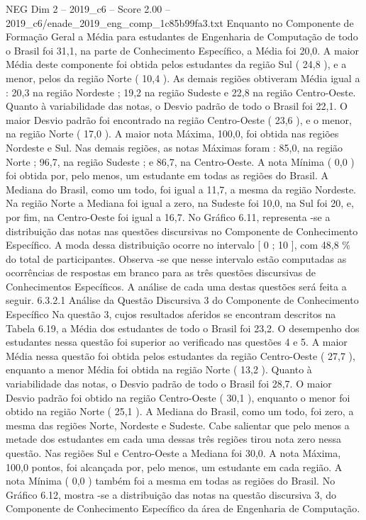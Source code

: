 \begin{textsample}{NEG Dim 2 – 2019\_c6 – Score 2.00 – 2019\_c6/enade\_2019\_eng\_comp\_1c85b99fa3.txt}
Enquanto no Componente de Formação Geral a Média para estudantes de Engenharia de Computação de todo o Brasil foi 31,1, na parte de Conhecimento Específico, a Média foi 20,0.
A maior Média deste componente foi obtida pelos estudantes da região Sul ( 24,8 ), e a menor, pelos da região Norte ( 10,4 ).
As demais regiões obtiveram Média igual a : 20,3 na região Nordeste ; 19,2 na região Sudeste e 22,8 na região Centro-Oeste.
Quanto à variabilidade das notas, o Desvio padrão de todo o Brasil foi 22,1.
O maior Desvio padrão foi encontrado na região Centro-Oeste ( 23,6 ), e o menor, na região Norte ( 17,0 ).
A maior nota Máxima, 100,0, foi obtida nas regiões Nordeste e Sul.
Nas demais regiões, as notas Máximas foram : 85,0, na região Norte ; 96,7, na região Sudeste ; e 86,7, na Centro-Oeste.
A nota Mínima ( 0,0 ) foi obtida por, pelo menos, um estudante em todas as regiões do Brasil.
A Mediana do Brasil, como um todo, foi igual a 11,7, a mesma da região Nordeste.
Na região Norte a Mediana foi igual a zero, na Sudeste foi 10,0, na Sul foi 20, e, por fim, na Centro-Oeste foi igual a 16,7.
No Gráfico 6.11, representa -se a distribuição das notas nas questões discursivas no Componente de Conhecimento Específico.
A moda dessa distribuição ocorre no intervalo [ 0 ; 10 ], com 48,8 \% do total de participantes.
Observa -se que nesse intervalo estão computadas as ocorrências de respostas em branco para as três questões discursivas de Conhecimentos Específicos.
A análise de cada uma destas questões será feita a seguir. 6.3.2.1 Análise da Questão Discursiva 3 do Componente de Conhecimento Específico Na questão 3, cujos resultados aferidos se encontram descritos na Tabela 6.19, a Média dos estudantes de todo o Brasil foi 23,2.
O desempenho dos estudantes nessa questão foi superior ao verificado nas questões 4 e 5.
A maior Média nessa questão foi obtida pelos estudantes da região Centro-Oeste ( 27,7 ), enquanto a menor Média foi obtida na região Norte ( 13,2 ).
Quanto à variabilidade das notas, o Desvio padrão de todo o Brasil foi 28,7.
O maior Desvio padrão foi obtido na região Centro-Oeste ( 30,1 ), enquanto o menor foi obtido na região Norte ( 25,1 ).
A Mediana do Brasil, como um todo, foi zero, a mesma das regiões Norte, Nordeste e Sudeste.
Cabe salientar que pelo menos a metade dos estudantes em cada uma dessas três regiões tirou nota zero nessa questão.
Nas regiões Sul e Centro-Oeste a Mediana foi 30,0.
A nota Máxima, 100,0 pontos, foi alcançada por, pelo menos, um estudante em cada região.
A nota Mínima ( 0,0 ) também foi a mesma em todas as regiões do Brasil.
No Gráfico 6.12, mostra -se a distribuição das notas na questão discursiva 3, do Componente de Conhecimento Específico da área de Engenharia de Computação.

\end{textsample}
